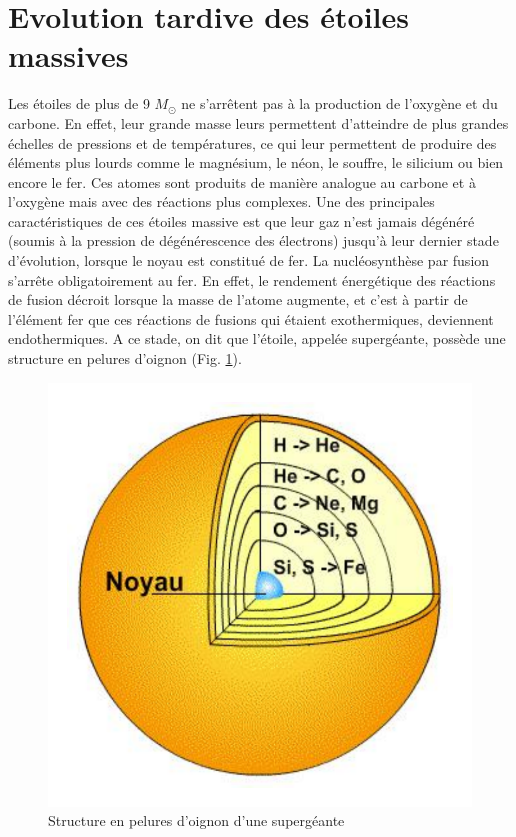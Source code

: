 \section{Evolution tardive des étoiles massives}\label{2.4}

Les étoiles de plus de 9 $M_\odot$ ne s’arrêtent pas à la production de l’oxygène et du carbone. En effet, leur grande masse leurs permettent d’atteindre de plus grandes échelles de pressions et de températures, ce qui leur permettent de produire des éléments plus lourds comme le magnésium, le néon, le souffre, le silicium ou bien encore le fer. Ces atomes sont produits de manière analogue au carbone et à l’oxygène mais avec des réactions plus complexes. Une des principales caractéristiques de ces étoiles massive est que leur gaz n’est jamais dégénéré (soumis à la pression de dégénérescence des électrons) jusqu’à leur dernier stade d’évolution, lorsque le noyau est constitué de fer. La nucléosynthèse par fusion s’arrête obligatoirement au fer. En effet, le rendement énergétique des réactions de fusion décroit lorsque la masse de l’atome augmente, et c’est à partir de l’élément fer que ces réactions de fusions qui étaient exothermiques, deviennent endothermiques. A ce stade, on dit que l’étoile, appelée supergéante, possède une structure en pelures d’oignon (Fig. \ref{Fig. 2.6}).

\begin{figure}[H]
	\centering
	\includegraphics[scale=0.3]{images/oignon}
	\caption[Structure en pelures d'oignon d'une supergéante\newline \url{https://media4.obspm.fr/public/ressources\_lu/pages\_vie-mort/impression.html}]{Structure en pelures d'oignon d'une supergéante}
	\label{Fig. 2.6}
\end{figure}\newpage

